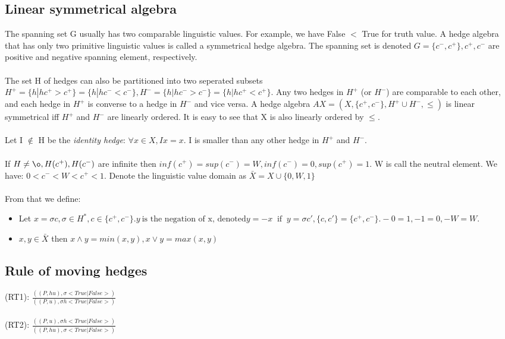 \documentclass[part1.tex]{subfiles}
\begin{document}
\subsection{Linear symmetrical algebra}
The spanning set G usually has two comparable linguistic values. For example, we have False \(<\) True
for truth value. A hedge algebra that has only two primitive linguistic values is called a symmetrical
hedge algebra. The spanning set is denoted \(G = \{c^-, c^+\}, c^+, c^-\) are positive and negative 
spanning element, respectively.\\\\

The set H of hedges can also be partitioned into two seperated subsets \(H^+ = \{h|hc^+ > c^+\} = 
\{h|hc^- < c^-\}, H^- = \{h|hc^- > c^-\} = 
\{h|hc^+ < c^+\}\). Any two hedges in \(H^+\) (or \(H^-\)) are comparable to each other, and each hedge in \(H^+\) is converse to a hedge in \(H^-\) and vice versa. A hedge algebra \(AX = (X,\{c^+,c^-\},H^+\cup
H^-, \le)\) is linear symmetrical iff \(H^+\) and \(H^-\) are linearly ordered. It is easy to see
that X is also linearly ordered by \(\le\).\\\\

Let I \(\notin\) H be the {\em identity hedge}: \(\forall x \in X, Ix = x\). I is smaller than any other
hedge in \(H^+\) and \(H^-\).\\\\

If \(H \neq {\o}, H(c^+), H(c^-)\) are infinite then \(inf(c^+) = sup(c^-) = W, inf(c^-) = 0, sup(c^+) = 1\). W is call the neutral element. We have: \(0<c^-<W<c^+<1\). Denote the linguistic value domain as
\(\bar X = X \cup \{0,W,1\}\)\\\\

From that we define:
\begin{itemize}
\item Let \(x = \sigma c, \sigma \in H^*, c \in \{c^+, c^-\}. y\: \text{is the negation of x, denoted}
	y = -x\: \text{ if }\: y = \sigma c', \{c,c'\} = \{c^+, c^-\}. -0 = 1, -1 = 0, -W = W\).
\item \(x,y \in \bar X\) then \(x \wedge y = min(x,y), x \vee y = max(x,y)\)
\end{itemize}


\subsection{Rule of moving hedges}
\indent (RT1): \(\frac{((P,hu),\sigma <True|False>)} {((P,u),\sigma h<True|False>)}\)
\\
\\
	(RT2): \(\frac{((P,u),\sigma h<True|False>)} {((P,hu),\sigma <True|False>)}\)
\end{document}
